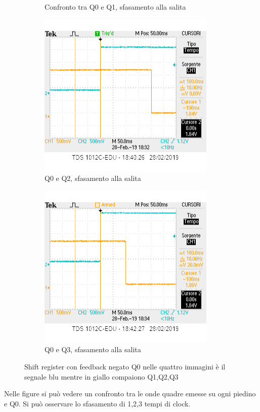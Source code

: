 \documentclass[10pt,a4paper]{article}
\begin{document}
\begin{figure}[h]
\begin{subfigure}[b]{0.4\linewidth}
		\caption{Confronto tra Q0 e Q1, sfasamento alla salita}
	\end{subfigure}
	\newline
	\begin{subfigure}[b]{0.4\linewidth}
		\includegraphics[width=\linewidth]{q0q2sr.png}
		\caption{Q0 e Q2, sfasamento alla salita}
	\end{subfigure}
	\begin{subfigure}[b]{0.4\linewidth}
		\includegraphics[width=\linewidth]{q0q3sr.png}
		\caption{Q0 e Q3, sfasamento alla salita}
	\end{subfigure}
	\caption{Shift register con feedback negato Q0 nelle quattro immagini è il segnale blu mentre in giallo compaiono Q1,Q2,Q3}
\end{figure}

Nelle figure si può  vedere un confronto tra le onde quadre emesse su ogni piedino e Q0. Si può osservare  lo sfasamento di 1,2,3 tempi di clock.
\end{document}
